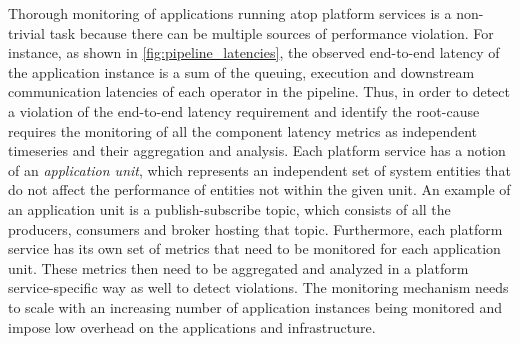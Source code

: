 \par Thorough monitoring of applications running atop platform services is a non-trivial task because there can be multiple sources of performance violation. For instance, as shown in \cref{fig:pipeline_latencies}, the observed end-to-end latency of the application instance is a sum of the queuing, execution and downstream communication latencies of each operator in the pipeline.  Thus, in order to detect a violation of the end-to-end latency requirement and identify the root-cause requires the monitoring of all the component latency metrics as independent timeseries and their aggregation and analysis. Each platform service has a notion of an \textit{application unit}, which represents an independent set of system entities that do not affect the performance of entities not within the given unit. An example of an application unit is a publish-subscribe topic, which consists of all the producers, consumers and broker hosting that topic. Furthermore, each platform service has its own set of metrics that need to be monitored for each application unit. These metrics then need to be aggregated and analyzed in a platform service-specific way as well to detect violations. The monitoring mechanism needs to scale with an increasing number of application instances being monitored and impose low overhead on the applications and infrastructure.

